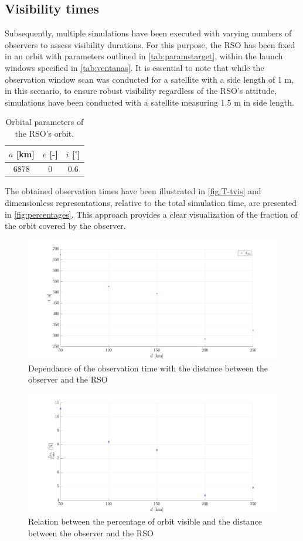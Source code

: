 \subsection{Visibility times}
Subsequently, multiple simulations have been executed with varying numbers of observers to assess visibility durations. For this purpose, the RSO has been fixed in an orbit with parameters outlined in \autoref{tab:paramstarget}, within the launch windows specified in \autoref{tab:ventanas}. It is essential to note that while the observation window scan was conducted for a satellite with a side length of 1 m, in this scenario, to ensure robust visibility regardless of the RSO's attitude, simulations have been conducted with a satellite measuring 1.5 m in side length.
\begin{table}[H]
    \centering
    \caption{Orbital parameters of the RSO's orbit.}
    \begin{tabular}{ccc}
    \toprule
    \textbf{$a$ [km]} & \textbf{$e$ [-]} & \textbf{$i$ [$^\circ$]} \\
    \midrule
    6878 & 0 & 0.6 \\
    \bottomrule
    \end{tabular}
    \label{tab:paramstarget}
\end{table}

The obtained observation times have been illustrated in \autoref{fig:T-tvis} and dimensionless representations, relative to the total simulation time, are presented in \autoref{fig:percentages}. This approach provides a clear visualization of the fraction of the orbit covered by the observer.

\begin{figure}[H]
    \centering
    \includegraphics[width=\textwidth]{Figures/T-tvis.png}
    \caption{Dependance of the observation time with the distance between the observer and the RSO}
    \label{fig:T-tvis}
\end{figure}

\begin{figure}[H]
    \centering
    \includegraphics[width=\textwidth]{Figures/percentage-orbit.png}
    \caption{Relation between the percentage of orbit visible and the distance between the observer and the RSO}
    \label{fig:percentages}
\end{figure}

